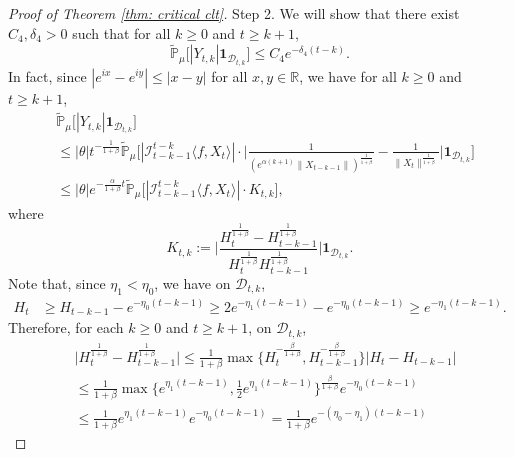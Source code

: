 \documentclass[12pt,a4paper]{amsart}
\theoremstyle{plain}
\theoremstyle{definition}
\numberwithin{equation}{section}
\begin{document}
\begin{proof}[Proof of Theorem \ref{thm: critical clt}]
  Step 2. We will show that there exist $C_4,\delta_4 > 0$ such that for all $k\geq 0$ and $t\geq k+1$,
  \begin{equation}
    \label{thm122}
    \mathbb{\widetilde{P}}_{\mu}\big[|Y_{t,k}|\mathbf{1}_{\mathcal{D}_{t,k}}\big]
    \leq  C_4 e^{-\delta_4 (t-k)}.
  \end{equation}
  In fact, since $|e^{ix}-e^{iy}|\leq|x-y|$ for all $x,y\in \mathbb R$, we have for all $k \geq 0$ and $t\geq k+1$,
  \begin{align}
    \label{eq: control of Ykt}
    & \mathbb{\widetilde{P}}_{\mu}\big[|Y_{t,k}|\mathbf{1}_{\mathcal{D}_{t,k}}\big] \\
    & \leq|\theta|t^{-\frac{1}{1+\beta}} \mathbb{\widetilde{P}}_{\mu}\bigg[|\mathcal I_{t-k-1}^{t-k}\langle f , X_t\rangle | \cdot \Big| \frac {1} {(e^{\alpha(k+1)} \| X_{t-k-1}\| )^{ \frac {1} {1+\beta} } } - \frac {1} {\|X_t\|^{\frac{1}{1+\beta}}}\Big|\mathbf{1}_{\mathcal{D}_{t,k}}\bigg] \\
    & \leq |\theta| e^{-\frac{\alpha}{1+\beta}t}\mathbb{\widetilde{P}}_{\mu}\big[|\mathcal I_{t-k-1}^{t-k}\langle f ,X_t\rangle|\cdot K_{t,k}\big],
  \end{align}
  where
  \begin{equation}
    \label{def: Ktk}
    K_{t,k}
    := \Big| \frac {H_t^{\frac{1}{1+\beta}}-H_{t-k-1}^{\frac{1}{1+\beta}}} {H_t^{\frac{1}{1+\beta}} H_{t-k-1}^{ \frac {1} {1+\beta} }} \Big| \mathbf{1}_{\mathcal{D}_{t,k}}.
  \end{equation}
  Note that, since $\eta_1 < \eta_0$, we have on $\mathcal D_{t,k}$,
  \begin{align}
    H_t
    & \geq H_{t-k-1}- e^{-\eta_0(t-k-1)}
      \geq 2e^{-\eta_1(t-k-1)}-e^{-\eta_0(t-k-1)}
      \geq e^{-\eta_1(t-k-1)}.
  \end{align}
  Therefore, for each $k \geq 0$ and $t\geq k+1$,  on $\mathcal D_{t,k}$,
  \begin{align}
    & \Big|H_t^{\frac{1}{1+\beta}}-H_{t-k-1}^{\frac{1}{1+\beta}}\Big|
      \leq \frac {1} {1+\beta} \max \Big \{ H_t^{-\frac{\beta}{1+\beta} }, H_{t-k-1}^{ -\frac{\beta}{1+\beta} } \Big\} \left| H_t - H_{t-k-1} \right| \\
    & \leq \frac{1}{1+\beta} \max\{e^{\eta_1 (t-k-1)}, \frac{1}{2}e^{\eta_1(t-k-1)}\}^{\frac{\beta}{1+\beta}}e^{-\eta_0(t-k-1)} \\
    & \leq \frac{1}{1+\beta} e^{\eta_1 (t-k-1)} e^{-\eta_0(t-k-1)}
    = \frac{1}{1+\beta}  e^{-(\eta_0 - \eta_1)(t-k-1)}
  \end{align}

\end{proof}
\end{document}
